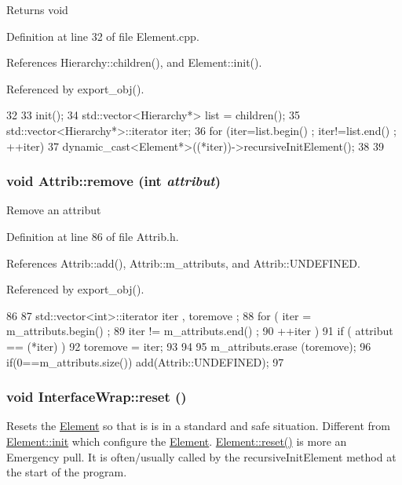 \begin{DoxyReturn}{Returns}
void 
\end{DoxyReturn}


Definition at line 32 of file Element.cpp.

References Hierarchy::children(), and Element::init().

Referenced by export\_\-obj().


\begin{DoxyCode}
32                                   {
33   init();
34   std::vector<Hierarchy*> list = children();
35   std::vector<Hierarchy*>::iterator iter;
36   for (iter=list.begin() ; iter!=list.end() ; ++iter){
37     dynamic_cast<Element*>((*iter))->recursiveInitElement();
38   }
39 }
\end{DoxyCode}
\hypertarget{classAttrib_a7d4ef7e32d93cb287792b87b857e79f3}{
\subsubsection[{remove}]{\setlength{\rightskip}{0pt plus 5cm}void Attrib::remove (int {\em attribut})}}
\label{classAttrib_a7d4ef7e32d93cb287792b87b857e79f3}
Remove an attribut 

Definition at line 86 of file Attrib.h.

References Attrib::add(), Attrib::m\_\-attributs, and Attrib::UNDEFINED.

Referenced by export\_\-obj().


\begin{DoxyCode}
86                                {
87     std::vector<int>::iterator iter , toremove ;
88     for ( iter  = m_attributs.begin() ;
89           iter != m_attributs.end()   ;
90           ++iter ) {
91       if ( attribut == (*iter) ) {
92         toremove = iter;
93       }
94     }
95     m_attributs.erase (toremove);
96     if(0==m_attributs.size()) add(Attrib::UNDEFINED);
97   }
\end{DoxyCode}
\hypertarget{structInterfaceWrap_a6c350b2f44c579187e6e4269cae29bae}{
\subsubsection[{reset}]{\setlength{\rightskip}{0pt plus 5cm}void InterfaceWrap::reset ()}}
\label{structInterfaceWrap_a6c350b2f44c579187e6e4269cae29bae}
Resets the \hyperlink{classElement}{Element} so that is is in a standard and safe situation. Different from \hyperlink{classElement_af42754b5cabc198869222725218d695c}{Element::init} which configure the \hyperlink{classElement}{Element}. \hyperlink{classElement_a69efffa22f06909d768149715565cb56}{Element::reset()} is more an Emergency pull. It is often/usually called by the recursiveInitElement method at the start of the program. 

